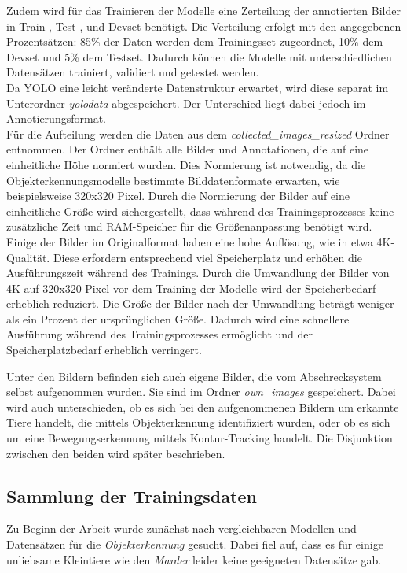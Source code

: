 Zudem wird für das Trainieren der Modelle eine Zerteilung der annotierten Bilder in Train-, Test-, und Devset benötigt. Die Verteilung erfolgt mit den angegebenen Prozentsätzen: 85\% der Daten werden dem Trainingsset zugeordnet, 10\% dem Devset und 5\% dem Testset. Dadurch können die Modelle mit unterschiedlichen Datensätzen trainiert, validiert und getestet werden.
\\
Da \ac{YOLO} eine leicht veränderte Datenstruktur erwartet, wird diese separat im Unterordner \textit{yolodata} abgespeichert. Der Unterschied liegt dabei jedoch im Annotierungsformat.
\\
Für die Aufteilung werden die Daten aus dem \textit{collected\_images\_resized} Ordner entnommen. Der Ordner enthält alle Bilder und Annotationen, die auf eine einheitliche Höhe normiert wurden. Dies Normierung ist notwendig, da die Objekterkennungsmodelle bestimmte Bilddatenformate erwarten, wie beispielsweise 320x320 Pixel. Durch die Normierung der Bilder auf eine einheitliche Größe wird sichergestellt, dass während des Trainingsprozesses keine zusätzliche Zeit und RAM-Speicher für die Größenanpassung benötigt wird.
\\
Einige der Bilder im Originalformat haben eine hohe Auflösung, wie in etwa 4K-Qualität. Diese erfordern entsprechend viel Speicherplatz und erhöhen die Ausführungszeit während des Trainings. Durch die Umwandlung der Bilder von 4K auf 320x320 Pixel vor dem Training der Modelle wird der Speicherbedarf erheblich reduziert. Die Größe der Bilder nach der Umwandlung beträgt weniger als ein Prozent der ursprünglichen Größe. Dadurch wird eine schnellere Ausführung während des Trainingsprozesses ermöglicht und der Speicherplatzbedarf erheblich verringert.

Unter den Bildern befinden sich auch eigene Bilder, die vom Abschrecksystem selbst aufgenommen wurden. Sie sind im Ordner \textit{own\_images} gespeichert. Dabei wird auch unterschieden, ob es sich bei den aufgenommenen Bildern um erkannte Tiere handelt, die mittels Objekterkennung identifiziert wurden, oder ob es sich um eine Bewegungserkennung mittels Kontur-Tracking handelt. Die Disjunktion zwischen den beiden wird später beschrieben. 

\subsection{Sammlung der Trainingsdaten}

Zu Beginn der Arbeit wurde zunächst nach vergleichbaren Modellen und Datensätzen für die \textit{Objekterkennung} gesucht. Dabei fiel auf, dass es für einige unliebsame Kleintiere wie den \textit{Marder} leider keine geeigneten Datensätze gab.

